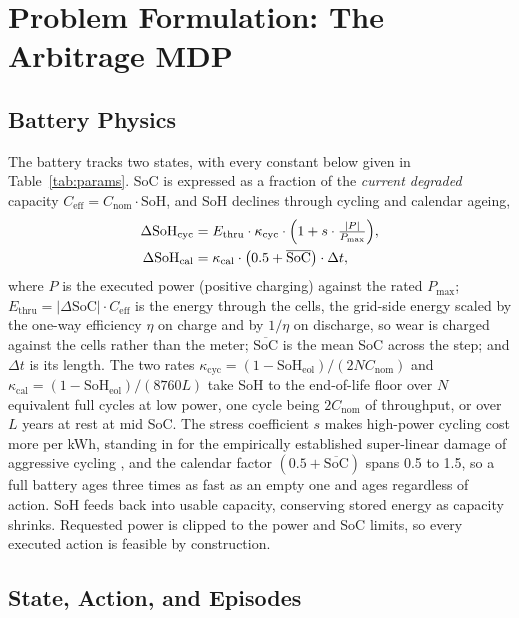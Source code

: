 \documentclass[conference]{IEEEtran}
\begin{document}
\section{Problem Formulation: The Arbitrage MDP}
\label{sec:problem-formulation}

\subsection{Battery Physics}
\label{sec:battery}

The battery tracks two states, with every constant below given in Table~\ref{tab:params}. SoC is expressed as a fraction of the \emph{current degraded} capacity $C_{\mathrm{eff}} = C_{\mathrm{nom}} \cdot \mathrm{SoH}$, and SoH declines through cycling and calendar ageing,
\begin{align}
  \Delta\mathrm{SoH}_{\mathrm{cyc}} &= E_{\mathrm{thru}} \cdot \kappa_{\mathrm{cyc}} \cdot \Bigl(1 + s \cdot \tfrac{|P|}{P_{\max}}\Bigr), \\
  \Delta\mathrm{SoH}_{\mathrm{cal}} &= \kappa_{\mathrm{cal}} \cdot \bigl(0.5 + \overline{\mathrm{SoC}}\bigr) \cdot \Delta t,
\end{align}
where $P$ is the executed power (positive charging) against the rated $P_{\max}$; $E_{\mathrm{thru}} = |\Delta\mathrm{SoC}| \cdot C_{\mathrm{eff}}$ is the energy through the cells, the grid-side energy scaled by the one-way efficiency $\eta$ on charge and by $1/\eta$ on discharge, so wear is charged against the cells rather than the meter; $\overline{\mathrm{SoC}}$ is the mean SoC across the step; and $\Delta t$ is its length. The two rates $\kappa_{\mathrm{cyc}} = (1 - \mathrm{SoH}_{\mathrm{eol}})/(2 N C_{\mathrm{nom}})$ and $\kappa_{\mathrm{cal}} = (1 - \mathrm{SoH}_{\mathrm{eol}})/(8760 L)$ take SoH to the end-of-life floor over $N$ equivalent full cycles at low power, one cycle being $2C_{\mathrm{nom}}$ of throughput, or over $L$ years at rest at mid SoC. The stress coefficient $s$ makes high-power cycling cost more per kWh, standing in for the empirically established super-linear damage of aggressive cycling \citep{xu2018degradation}, and the calendar factor $(0.5 + \overline{\mathrm{SoC}})$ spans 0.5 to 1.5, so a full battery ages three times as fast as an empty one and ages regardless of action. SoH feeds back into usable capacity, conserving stored energy as capacity shrinks. Requested power is clipped to the power and SoC limits, so every executed action is feasible by construction.

\subsection{State, Action, and Episodes}
\end{document}
